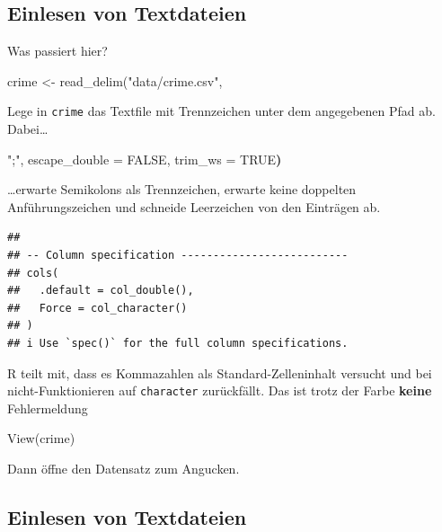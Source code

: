 \documentclass[
]{book}
\newenvironment{Shaded}{\begin{snugshade}}{\end{snugshade}}
\newcommand{\ConstantTok}[1]{\textcolor[rgb]{0.00,0.00,0.00}{#1}}
\newcommand{\ErrorTok}[1]{\textcolor[rgb]{0.64,0.00,0.00}{\textbf{#1}}}
\newcommand{\FunctionTok}[1]{\textcolor[rgb]{0.00,0.00,0.00}{#1}}
\newcommand{\NormalTok}[1]{#1}
\newcommand{\OtherTok}[1]{\textcolor[rgb]{0.56,0.35,0.01}{#1}}
\newcommand{\StringTok}[1]{\textcolor[rgb]{0.31,0.60,0.02}{#1}}
\begin{document}
\hypertarget{einlesen-von-textdateien-1}{%
\subsection{Einlesen von Textdateien}\label{einlesen-von-textdateien-1}}

Was passiert hier?

\begin{Shaded}
\begin{Highlighting}[]
\NormalTok{crime }\OtherTok{\textless{}{-}} \FunctionTok{read\_delim}\NormalTok{(}\StringTok{"data/crime.csv"}\NormalTok{, }
\end{Highlighting}
\end{Shaded}

Lege in \texttt{crime} das Textfile mit Trennzeichen unter dem angegebenen Pfad ab. Dabei\ldots{}

\begin{Shaded}
\begin{Highlighting}[]
\StringTok{";"}\NormalTok{, escape\_double }\OtherTok{=} \ConstantTok{FALSE}\NormalTok{, trim\_ws }\OtherTok{=} \ConstantTok{TRUE}\ErrorTok{)}
\end{Highlighting}
\end{Shaded}

\ldots erwarte Semikolons als Trennzeichen, erwarte keine doppelten Anführungszeichen und schneide Leerzeichen von den Einträgen ab.

\begin{verbatim}
## 
## -- Column specification --------------------------
## cols(
##   .default = col_double(),
##   Force = col_character()
## )
## i Use `spec()` for the full column specifications.
\end{verbatim}

R teilt mit, dass es Kommazahlen als Standard-Zelleninhalt versucht und bei nicht-Funktionieren auf \texttt{character} zurückfällt. Das ist trotz der Farbe \textbf{keine} Fehlermeldung

\begin{Shaded}
\begin{Highlighting}[]
\FunctionTok{View}\NormalTok{(crime)}
\end{Highlighting}
\end{Shaded}

Dann öffne den Datensatz zum Angucken.

\hypertarget{einlesen-von-textdateien-2}{%
\subsection{Einlesen von Textdateien}\label{einlesen-von-textdateien-2}}
\end{document}
